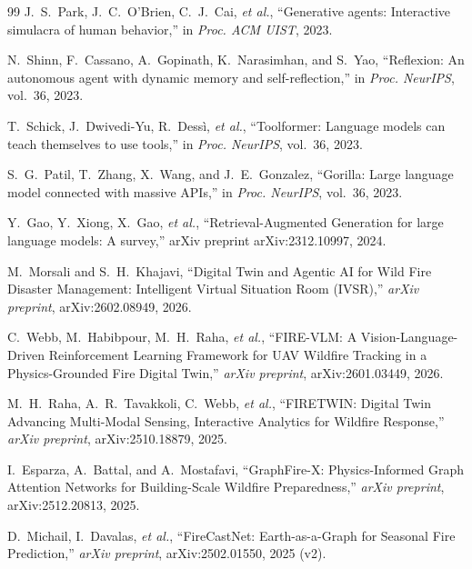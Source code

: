 \documentclass[preprint,times,numbers]{elsarticle}
\begin{document}
\begin{thebibliography}{99}
J.~S.~Park, J.~C.~O'Brien, C.~J.~Cai, \textit{et al.}, ``Generative agents: Interactive simulacra of human behavior,'' in \textit{Proc. ACM UIST}, 2023.

N.~Shinn, F.~Cassano, A.~Gopinath, K.~Narasimhan, and S.~Yao, ``Reflexion: An autonomous agent with dynamic memory and self-reflection,'' in \textit{Proc. NeurIPS}, vol.~36, 2023.

T.~Schick, J.~Dwivedi-Yu, R.~Dess\`{i}, \textit{et al.}, ``Toolformer: Language models can teach themselves to use tools,'' in \textit{Proc. NeurIPS}, vol.~36, 2023.

S.~G.~Patil, T.~Zhang, X.~Wang, and J.~E.~Gonzalez, ``Gorilla: Large language model connected with massive APIs,'' in \textit{Proc. NeurIPS}, vol.~36, 2023.

Y.~Gao, Y.~Xiong, X.~Gao, \textit{et al.}, ``Retrieval-Augmented Generation for large language models: A survey,'' arXiv preprint arXiv:2312.10997, 2024.


M.~Morsali and S.~H.~Khajavi, ``Digital Twin and Agentic AI for Wild Fire Disaster Management: Intelligent Virtual Situation Room (IVSR),'' \textit{arXiv preprint}, arXiv:2602.08949, 2026.

C.~Webb, M.~Habibpour, M.~H.~Raha, \emph{et al.}, ``FIRE-VLM: A Vision-Language-Driven Reinforcement Learning Framework for UAV Wildfire Tracking in a Physics-Grounded Fire Digital Twin,'' \textit{arXiv preprint}, arXiv:2601.03449, 2026.

M.~H.~Raha, A.~R.~Tavakkoli, C.~Webb, \emph{et al.}, ``FIRETWIN: Digital Twin Advancing Multi-Modal Sensing, Interactive Analytics for Wildfire Response,'' \textit{arXiv preprint}, arXiv:2510.18879, 2025.

I.~Esparza, A.~Battal, and A.~Mostafavi, ``GraphFire-X: Physics-Informed Graph Attention Networks for Building-Scale Wildfire Preparedness,'' \textit{arXiv preprint}, arXiv:2512.20813, 2025.

D.~Michail, I.~Davalas, \emph{et al.}, ``FireCastNet: Earth-as-a-Graph for Seasonal Fire Prediction,'' \textit{arXiv preprint}, arXiv:2502.01550, 2025 (v2).


\end{thebibliography}
\end{document}
